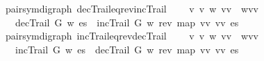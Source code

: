 \begin{isabellebody}
\begin{isamarkuptext}
\end{isamarkuptext}\isamarkuptrue%
\isamarkupfalse%
{\isacharparenleft}\ pair{\isacharunderscore}sym{\isacharunderscore}digraph{\isacharparenright}\ decTrail{\isacharunderscore}eq{\isacharunderscore}rev{\isacharunderscore}incTrail{\isacharcolon}\isanewline
\ \ \ {\isachardoublequoteopen}{\isasymforall}\ v\ v\ w\ {\isacharparenleft}vv\ {\isacharequal}\ w{\isacharparenleft}vv\ \isanewline
\ \ \ {\isachardoublequoteopen}decTrail\ G\ w\ es\ {\isasymlongleftrightarrow}\ incTrail\ G\ w\ {\isacharparenleft}rev\ {\isacharparenleft}map\ {\isacharparenleft}{\isasymlambda}{\isacharparenleft}vv\ {\isacharparenleft}vv\ es{\isacharparenright}{\isacharparenright}{\isachardoublequoteclose}\isanewline
\ \ \ \ %
\isadelimproof
%
\endisadelimproof
%
\isatagproof
%
\endisatagproof
{\isafoldproof}%
%
\isadelimproof
%
\endisadelimproof
\isanewline
{}\isamarkupfalse%
{\isacharparenleft}\ pair{\isacharunderscore}sym{\isacharunderscore}digraph{\isacharparenright}\ incTrail{\isacharunderscore}eq{\isacharunderscore}rev{\isacharunderscore}decTrail{\isacharcolon}\isanewline
\ \ \ {\isachardoublequoteopen}{\isasymforall}\ v\ v\ w\ {\isacharparenleft}vv\ {\isacharequal}\ w{\isacharparenleft}vv\ \isanewline
\ \ \ {\isachardoublequoteopen}incTrail\ G\ w\ es\ {\isasymlongleftrightarrow}\ decTrail\ G\ w\ {\isacharparenleft}rev\ {\isacharparenleft}map\ {\isacharparenleft}{\isasymlambda}{\isacharparenleft}vv\ {\isacharparenleft}vv\ es{\isacharparenright}{\isacharparenright}{\isachardoublequoteclose}%

\end{isabellebody}
